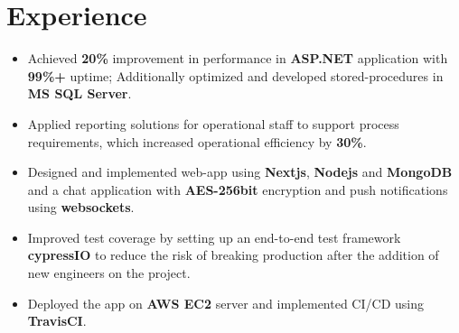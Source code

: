 \documentclass[]{deedy-resume-openfont}
\begin{document}
\hfill
\begin{minipage}[t]{0.66\textwidth} 

\section{Experience}

\sectionsep
\runsubsection{}
\begin{itemize}
    \item Achieved {\fontsize{11pt}{10pt}\selectfont\bfseries 20\%} improvement in performance in {\fontsize{11pt}{10pt}\selectfont\bfseries ASP.NET} application with {\fontsize{11pt}{10pt}\selectfont\bfseries 99\%+} uptime; Additionally optimized and developed stored-procedures in {\fontsize{11pt}{10pt}\selectfont\bfseries MS SQL Server}.
    
    \item Applied reporting solutions for operational staff to support process requirements, which increased operational efficiency by {\fontsize{11pt}{10pt}\selectfont\bfseries 30\%}.
\end{itemize}
\sectionsep


\sectionsep
\runsubsection{}
\begin{itemize}
    \item Designed and implemented web-app using {\fontsize{11pt}{10pt}\selectfont\bfseries Nextjs}, {\fontsize{11pt}{10pt}\selectfont\bfseries Nodejs} and {\fontsize{11pt}{10pt}\selectfont\bfseries MongoDB}  and a chat application with {\fontsize{11pt}{10pt}\selectfont\bfseries AES-256bit} encryption and push notifications using {\fontsize{11pt}{10pt}\selectfont\bfseries websockets}. 
    \item Improved test coverage by setting up an end-to-end test framework {\fontsize{11pt}{10pt}\selectfont\bfseries cypressIO} to reduce the risk of breaking production after the addition of new engineers on the project.
    \item Deployed the app on {\fontsize{11pt}{10pt}\selectfont\bfseries AWS EC2} server and implemented CI/CD using {\fontsize{11pt}{10pt}\selectfont\bfseries TravisCI}.
\end{itemize}
\sectionsep


\end{minipage}
\end{document}
